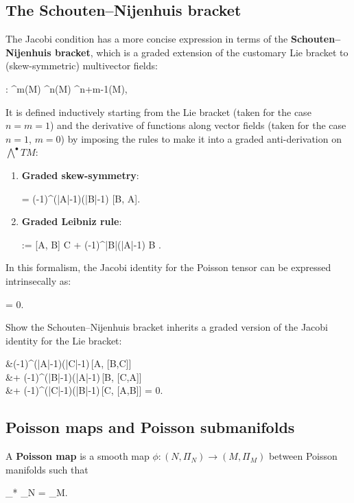 \subsection{The Schouten--Nijenhuis bracket}
The Jacobi condition has a more concise expression in terms of the \textbf{Schouten--Nijenhuis bracket}, which is a graded extension of the customary Lie bracket to (skew-symmetric) multivector fields:
\begin{eqalign}
	[-, -] : \fields^m(M) \times \fields^n(M) \longto \fields^{n+m-1}(M), 
\end{eqalign}
It is defined inductively starting from the Lie bracket (taken for the case $n=m=1$) and the derivative of functions along vector fields (taken for the case $n=1$, $m=0$) by imposing the rules to make it into a graded anti-derivation on $\bigwedge^\bullet TM$:
\begin{enumerate}
	\item \textbf{Graded skew-symmetry}:
	\begin{eqalign}
		[A,B] = (-1)^{(|A|-1)(|B|-1)} [B, A].
	\end{eqalign}
	\item \textbf{Graded Leibniz rule}:
	\begin{eqalign}
		[A,B \wedge C] := [A, B] \wedge C + (-1)^{|B|(|A|-1)} B \wedge [A,C].
	\end{eqalign}
\end{enumerate}

In this formalism, the Jacobi identity for the Poisson tensor can be expressed intrinsecally as:
\begin{eqalign}
	[\Pi, \Pi] = 0.
\end{eqalign}

\begin{exercise}
\label{ex:graded_jacobi}
	Show the Schouten--Nijenhuis bracket inherits a graded version of the Jacobi identity for the Lie bracket:
	\begin{eqalign}
		&(-1)^{(|A|-1)(|C|-1)}\,[A, [B,C]]\\
			&\qquad \qquad + (-1)^{(|B|-1)(|A|-1)}\,[B, [C,A]]\\
				&\qquad \qquad \qquad \qquad + (-1)^{(|C|-1)(|B|-1)}\,[C, [A,B]] = 0.
	\end{eqalign}
\end{exercise}

\subsection{Poisson maps and Poisson submanifolds}
\begin{definition}
	A \textbf{Poisson map} is a smooth map $\phi : (N, \Pi_N) \to (M, \Pi_M)$ between Poisson manifolds such that
	\begin{eqalign}
	\label{eq:poisson_map_condition}
		\phi_* \Pi_N = \Pi_M.
	\end{eqalign}
\end{definition}

